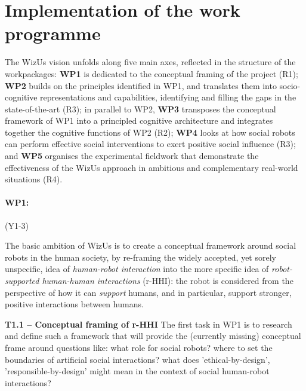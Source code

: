 \documentclass[11pt,a4paper]{report}
\newcommand{\project}{WizUs\xspace}
\begin{document}
\section{Implementation of the work programme}

The \project vision unfolds along five main axes, reflected in the structure of
the workpackages: \textbf{WP1} is dedicated to the conceptual framing of the
project (R1); \textbf{WP2} builds on the principles identified in WP1, and
translates them into socio-cognitive representations and capabilities,
identifying and filling the gaps in the state-of-the-art (R3); in parallel to
WP2, \textbf{WP3} transposes the conceptual framework of WP1 into a principled
cognitive architecture and integrates together the cognitive functions of WP2
(R2); \textbf{WP4} looks at how social robots can perform effective social
interventions to exert positive social influence (R3); and \textbf{WP5}
organises the experimental fieldwork that demonstrate the effectiveness of the
\project approach in ambitious and complementary real-world situations (R4).

\paragraph{WP1: \textbf{\wpOne}} (Y1-3)

The basic ambition of \project is to create a conceptual framework around social
robots in the human society, by re-framing the widely accepted, yet sorely
unspecific, idea of \emph{human-robot interaction} into the more specific idea
of \emph{robot-supported human-human interactions} (r-HHI): the robot is
considered from the perspective of how it can \emph{support} humans, and in
particular, support stronger, positive interactions between humans.

\textbf{T1.1 -- Conceptual framing of r-HHI} The first task in WP1 is to research and
define such a framework that will provide the (currently missing) conceptual
frame around questions like: what role for social robots? where to set the
boundaries of artificial social interactions? what does 'ethical-by-design',
'responsible-by-design' might mean in the context of social human-robot
interactions? 
\end{document}
